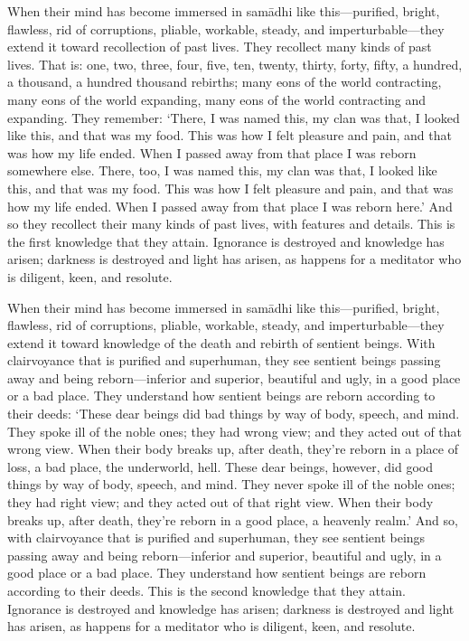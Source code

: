 \documentclass[12pt,openany]{book}%
\begin{document}
When their mind has become immersed in \textsanskrit{samādhi} like this—purified, bright, flawless, rid of corruptions, pliable, workable, steady, and imperturbable—they extend it toward recollection of past lives. They recollect many kinds of past lives. That is: one, two, three, four, five, ten, twenty, thirty, forty, fifty, a hundred, a thousand, a hundred thousand rebirths; many eons of the world contracting, many eons of the world expanding, many eons of the world contracting and expanding. They remember: ‘There, I was named this, my clan was that, I looked like this, and that was my food. This was how I felt pleasure and pain, and that was how my life ended. When I passed away from that place I was reborn somewhere else. There, too, I was named this, my clan was that, I looked like this, and that was my food. This was how I felt pleasure and pain, and that was how my life ended. When I passed away from that place I was reborn here.’ And so they recollect their many kinds of past lives, with features and details. This is the first knowledge that they attain. Ignorance is destroyed and knowledge has arisen; darkness is destroyed and light has arisen, as happens for a meditator who is diligent, keen, and resolute. 

When their mind has become immersed in \textsanskrit{samādhi} like this—purified, bright, flawless, rid of corruptions, pliable, workable, steady, and imperturbable—they extend it toward knowledge of the death and rebirth of sentient beings. With clairvoyance that is purified and superhuman, they see sentient beings passing away and being reborn—inferior and superior, beautiful and ugly, in a good place or a bad place. They understand how sentient beings are reborn according to their deeds: ‘These dear beings did bad things by way of body, speech, and mind. They spoke ill of the noble ones; they had wrong view; and they acted out of that wrong view. When their body breaks up, after death, they’re reborn in a place of loss, a bad place, the underworld, hell. These dear beings, however, did good things by way of body, speech, and mind. They never spoke ill of the noble ones; they had right view; and they acted out of that right view. When their body breaks up, after death, they’re reborn in a good place, a heavenly realm.’ And so, with clairvoyance that is purified and superhuman, they see sentient beings passing away and being reborn—inferior and superior, beautiful and ugly, in a good place or a bad place. They understand how sentient beings are reborn according to their deeds. This is the second knowledge that they attain. Ignorance is destroyed and knowledge has arisen; darkness is destroyed and light has arisen, as happens for a meditator who is diligent, keen, and resolute. 
\end{document}
